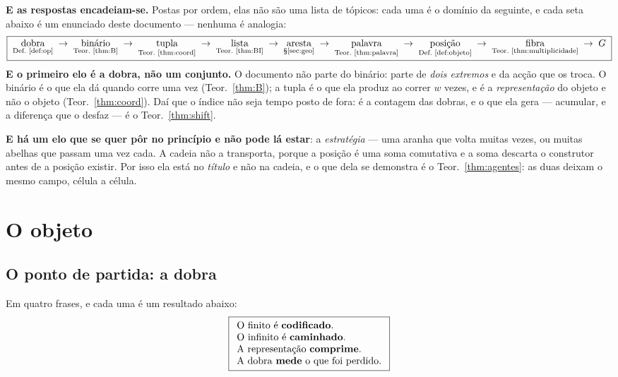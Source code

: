 \documentclass[11pt,a4paper]{article}
\begin{document}
\medskip\noindent\textbf{E as respostas encadeiam-se.} Postas por ordem, elas
não são uma lista de tópicos: cada uma é o domínio da seguinte, e cada seta
abaixo é um enunciado deste documento --- nenhuma é analogia:
\[
\boxed{\;
\underset{\text{Def.~\ref{def:op}}}{\text{dobra}}
\;\to\;
\underset{\text{Teor.~\ref{thm:B}}}{\text{binário}}
\;\to\;
\underset{\text{Teor.~\ref{thm:coord}}}{\text{tupla}}
\;\to\;
\underset{\text{Teor.~\ref{thm:BI}}}{\text{lista}}
\;\to\;
\underset{\text{§\ref{sec:geo}}}{\text{aresta}}
\;\to\;
\underset{\text{Teor.~\ref{thm:palavra}}}{\text{palavra}}
\;\to\;
\underset{\text{Def.~\ref{def:objeto}}}{\text{posição}}
\;\to\;
\underset{\text{Teor.~\ref{thm:multiplicidade}}}{\text{fibra}}
\;\to\;
G \;}
\]
\noindent\textbf{E o primeiro elo é a dobra, não um conjunto.} O documento não
parte do binário: parte de \emph{dois extremos} e da acção que os troca. O
binário é o que ela dá quando corre uma vez (Teor.~\ref{thm:B}); a tupla é o que
ela produz ao correr $w$ vezes, e é a \emph{representação} do objeto e não o
objeto (Teor.~\ref{thm:coord}). Daí que o índice não seja tempo posto de fora:
é a contagem das dobras, e o que ela gera --- acumular, e a diferença que o
desfaz --- é o Teor.~\ref{thm:shift}.

\medskip\noindent\textbf{E há um elo que se quer pôr no princípio e não pode lá
estar}: a \emph{estratégia} --- uma aranha que volta muitas vezes, ou muitas
abelhas que passam uma vez cada. A cadeia não a transporta, porque a posição é
uma soma comutativa e a soma descarta o construtor antes de a posição existir.
Por isso ela está no \emph{título} e não na cadeia, e o que dela se demonstra é
o Teor.~\ref{thm:agentes}: as duas deixam o mesmo campo, célula a célula.

\section{O objeto}\label{sec:objeto}

\subsection*{O ponto de partida: a dobra}

\noindent Em quatro frases, e cada uma é um resultado abaixo:
\[
\boxed{
\begin{array}{l}
\text{O finito é \textbf{codificado}.}\\
\text{O infinito é \textbf{caminhado}.}\\
\text{A representação \textbf{comprime}.}\\
\text{A dobra \textbf{mede} o que foi perdido.}
\end{array}}
\]
\end{document}
